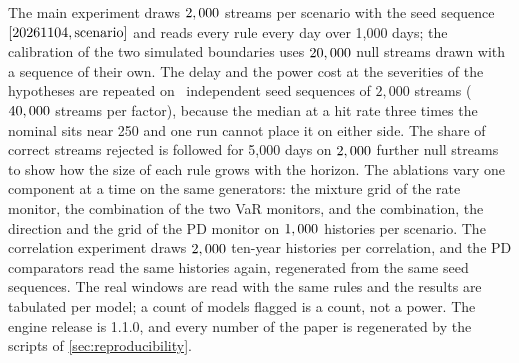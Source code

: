 The main experiment draws $2,000$ streams per scenario with the seed sequence $[20261104,\text{scenario}]$ and reads every rule every day over 1,000 days; the calibration of the two simulated boundaries uses $20,000$ null streams drawn with a sequence of their own. The delay and the power cost at the severities of the hypotheses are repeated on \nSeedsCount\ independent seed sequences of $2{,}000$ streams ($40,000$ streams per factor),
because the median at a hit rate three times the nominal sits near 250 and one run cannot place it on either side. The share of correct streams rejected is followed for 5,000 days on $2,000$ further null streams to show how the size of each rule grows with the horizon. The ablations vary one component at a time on the same generators: the mixture grid of the rate monitor, the combination of the two VaR monitors, and the
combination, the direction and the grid of the PD monitor on $1,000$ histories per scenario. The correlation experiment draws $2,000$ ten-year histories per correlation, and the PD comparators read the same histories again, regenerated from the same seed sequences. The real windows are read with the same rules and the results are tabulated per model; a count of models flagged is a count, not a power. The engine release is 1.1.0, and every number of the paper is regenerated by the scripts of \cref{sec:reproducibility}.
